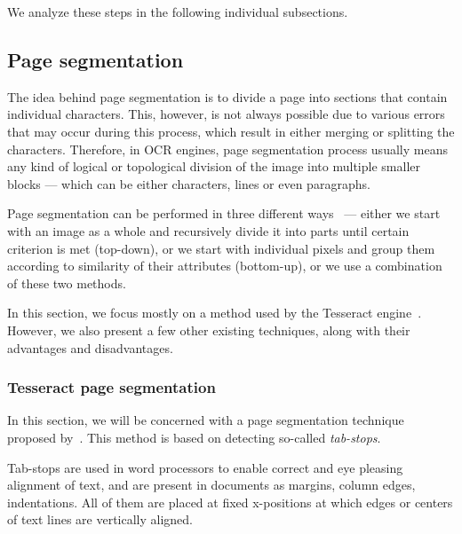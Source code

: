 We analyze these steps in the following individual subsections.

\subsection{Page segmentation} \label{pageSegmentation}

The idea behind page segmentation is to divide a page into sections that contain individual characters. This, however, is not always possible due to various errors that may occur during this process, which result in either merging or splitting the characters. Therefore, in OCR engines, page segmentation process usually means any kind of logical or topological division of the image into multiple smaller blocks --- which can be either characters, lines or even paragraphs.

Page segmentation can be performed in three different ways~\citep{segmentationOverview} --- either we start with an image as a whole and recursively divide it into parts until certain criterion is met (top-down), or we start with individual pixels and group them according to similarity of their attributes (bottom-up), or we use a combination of these two methods.

In this section, we focus mostly on a method used by the Tesseract engine~\cite{tesseractSegmentationTab}. However, we also present a few other existing techniques, along with their advantages and disadvantages.

\subsubsection{Tesseract page segmentation} \label{sectionTessPageSegm}

In this section, we will be concerned with a page segmentation technique proposed by~\citet{tesseractSegmentationTab}. This method is based on detecting so-called \emph{tab-stops}.

Tab-stops are used in word processors to enable correct and eye pleasing alignment of text, and are present in documents as margins, column edges, indentations. All of them are placed at fixed x-positions at which edges or centers of text lines are vertically aligned.


